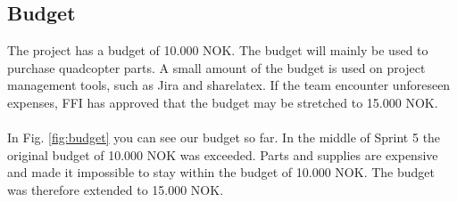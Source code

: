 \subsection{Budget}
The project has a budget of 10.000 NOK. The budget will mainly be used to purchase quadcopter parts. A small amount of the budget is used on project management tools, such as Jira and sharelatex. If the team encounter unforeseen expenses, FFI has approved that the budget may be stretched to 15.000 NOK.
\\\\
In Fig. \ref{fig:budget} you can see our budget so far. In the middle of Sprint 5 the original budget of 10.000 NOK was exceeded. Parts and supplies are expensive and made it impossible to stay within the budget of 10.000 NOK. The budget was therefore extended to 15.000 NOK. 

